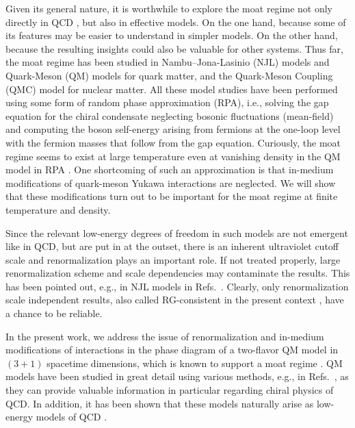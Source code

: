 \documentclass[reprint,english,superscriptaddress,preprintnumbers,amsmath,amssymb,aps,prd]{revtex4-2}
\begin{document}
Given its general nature, it is worthwhile to explore the moat regime not only directly in QCD \cite{Fu:2019hdw, Fu:2024rto}, but also in effective models. On the one hand, because some of its features may be easier to understand in simpler models. On the other hand, because the resulting insights could also be valuable for other systems. Thus far, the moat regime has been studied in Nambu--Jona-Lasinio (NJL) models \cite{Koenigstein:2021llr, Pannullo:2023one, Pannullo:2023cat, Koenigstein:2023yzv, Winstel:2024dqu, Pannullo:2024sov} and Quark-Meson (QM) models \cite{Topfel:2024iop, Cao:2025zvh} for quark matter, and the Quark-Meson Coupling (QMC) model \cite{Motta:2025xop} for nuclear matter. All these model studies have been performed using some form of random phase approximation (RPA), i.e., solving the gap equation for the chiral condensate neglecting bosonic fluctuations (mean-field) and computing the boson self-energy arising from fermions at the one-loop level with the fermion masses that follow from the gap equation. Curiously, the moat regime seems to exist at large temperature even at vanishing density in the QM model in RPA \cite{Topfel:2024iop, Cao:2025zvh}. One shortcoming of such an approximation is that in-medium modifications of quark-meson Yukawa interactions are neglected. We will show that these modifications turn out to be important for the moat regime at finite temperature and density. 

Since the relevant low-energy degrees of freedom in such models are not emergent like in QCD, but are put in at the outset, there is an inherent ultraviolet cutoff scale and renormalization plays an important role. If not treated properly, large renormalization scheme and scale dependencies may contaminate the results. This has been pointed out, e.g., in NJL models in Refs.\ \cite{Partyka:2008sv, Buballa:2020nsi, Pannullo:2023cat, Pannullo:2024sov}. Clearly, only renormalization scale independent results, also called RG-consistent in the present context \cite{Braun:2018svj}, have a chance to be reliable. 

In the present work, we address the issue of renormalization and in-medium modifications of interactions in the phase diagram of a two-flavor QM model in $(3\!+\!1)$ spacetime dimensions, which is known to support a moat regime \cite{Topfel:2024iop}. QM models have been studied in great detail using various methods, e.g., in Refs.\ \cite{Gell-Mann:1960mvl, Jungnickel:1995fp, Schaefer:2004en, Tripolt:2013jra, Pawlowski:2014zaa, Kovacs:2016juc}, as they can provide valuable information in particular regarding chiral physics of QCD. In addition, it has been shown that these models naturally arise as low-energy models of QCD \cite{Braun:2014ata, Rennecke:2015eba, Rennecke:2015lur, Cyrol:2017ewj, Fu:2019hdw, Ihssen:2024miv}.
\end{document}
